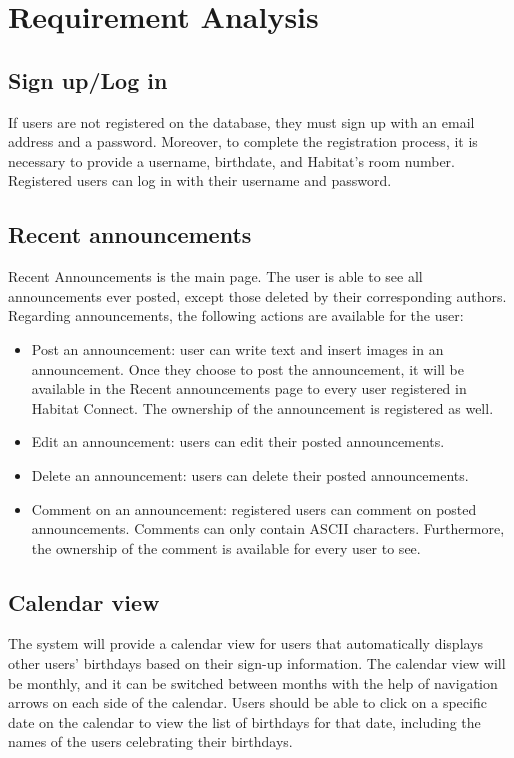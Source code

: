 \documentclass[conference]{IEEEtran}
\begin{document}
\section{Requirement Analysis}
\subsection{Sign up/Log in}
If users are not registered on the database, they must sign up with an email address and a password. Moreover, to complete the registration process, it is necessary to provide a username, birthdate, and Habitat’s room number.
Registered users can log in with their username and password.
\subsection{Recent announcements}
Recent Announcements is the main page. The user is able to see all announcements ever posted, except those deleted by their corresponding authors. Regarding announcements, the following actions are available for the user:
\begin{itemize}
    \item Post an announcement: user can write text and insert images in an announcement. Once they choose to post the announcement, it will be available in the Recent announcements page to every user registered in Habitat Connect. The ownership of the announcement is registered as well.
    \item Edit an announcement: users can edit their posted announcements.
    \item Delete an announcement: users can delete their posted announcements.
    \item Comment on an announcement: registered users can comment on posted announcements. Comments can only contain ASCII characters. Furthermore, the ownership of the comment is available for every user to see.
\end{itemize}
\subsection{Calendar view}
The system will provide a calendar view for users that automatically displays other users' birthdays based on their sign-up information. The calendar view will be monthly, and it can be switched between months with the help of navigation arrows on each side of the calendar. Users should be able to click on a specific date on the calendar to view the list of birthdays for that date, including the names of the users celebrating their birthdays.
\end{document}

